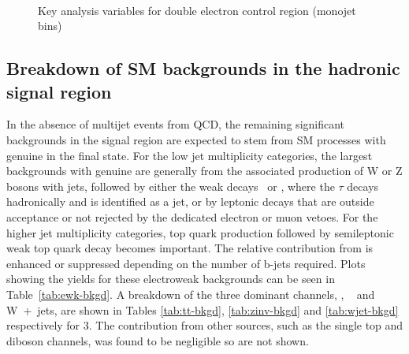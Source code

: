\begin{figure}
\begin{center}
         \\
        \caption{Key analysis variables for double electron control region (monojet bins)}
        \label{fig:distribution_doubleele_mono}
    \end{center}
\end{figure}

\clearpage

\subsection{Breakdown of SM backgrounds in the hadronic signal
  region\label{sec:bkgd-comp}}

In the absence of multijet events from QCD, the remaining significant
backgrounds in the signal region are expected to stem from SM
processes with genuine \met in the final state. For the low jet
multiplicity categories, the largest backgrounds with genuine \met are
generally from the associated production of W or Z bosons with jets,
followed by either the weak decays \znunu\ or \wtaunu, where the
$\tau$ decays hadronically and is identified as a jet, or by leptonic
decays that are outside acceptance or not rejected by the dedicated
electron or muon vetoes. For the higher jet multiplicity categories,
top quark production followed by semileptonic weak top quark decay
becomes important. The relative contribution from \ttbar is enhanced
or suppressed depending on the number of b-jets required. 
Plots showing the yields for these electroweak backgrounds can be seen in Table~\ref{tab:ewk-bkgd}.
A breakdown of the three
dominant channels, \ttbar, \zInv~ and W~+~jets, are shown in Tables \ref{tab:tt-bkgd}, 
\ref{tab:zinv-bkgd} and \ref{tab:wjet-bkgd} respectively for 3\ifb. The contribution from
other sources, such as the single top and diboson channels, was found to be
negligible so are not shown.

